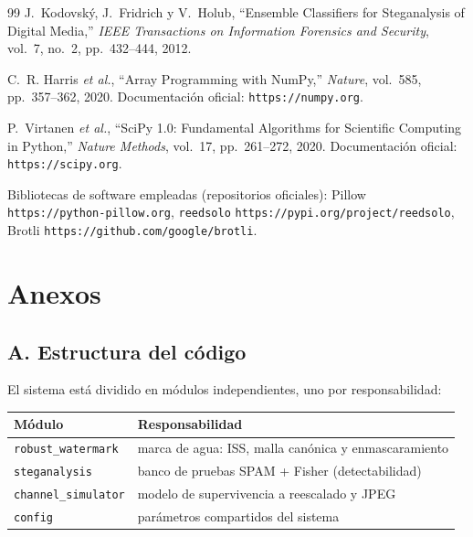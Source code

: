 \documentclass[12pt,a4paper]{article}
\begin{document}
\begin{thebibliography}{99}
J.~Kodovský, J.~Fridrich y V.~Holub, ``Ensemble Classifiers for Steganalysis of
Digital Media,'' \emph{IEEE Transactions on Information Forensics and Security},
vol.~7, no.~2, pp.~432--444, 2012.

C.~R. Harris \emph{et al.}, ``Array Programming with NumPy,'' \emph{Nature},
vol.~585, pp.~357--362, 2020. Documentación oficial: \texttt{https://numpy.org}.

P.~Virtanen \emph{et al.}, ``SciPy 1.0: Fundamental Algorithms for Scientific
Computing in Python,'' \emph{Nature Methods}, vol.~17, pp.~261--272, 2020.
Documentación oficial: \texttt{https://scipy.org}.

Bibliotecas de software empleadas (repositorios oficiales):
Pillow \texttt{https://python-pillow.org},
\texttt{reedsolo} \texttt{https://pypi.org/project/reedsolo},
Brotli \texttt{https://github.com/google/brotli}.

\end{thebibliography}

\section{Anexos}

\subsection*{A. Estructura del código}
El sistema está dividido en módulos independientes, uno por responsabilidad:

\begin{table}[H]
\centering
\begin{tabular}{@{}ll@{}}
\toprule
\textbf{Módulo} & \textbf{Responsabilidad} \\
\midrule
\texttt{robust\_watermark} & marca de agua: ISS, malla canónica y enmascaramiento \\
\texttt{steganalysis} & banco de pruebas SPAM + Fisher (detectabilidad) \\
\texttt{channel\_simulator} & modelo de supervivencia a reescalado y JPEG \\
\texttt{config} & parámetros compartidos del sistema \\
\bottomrule
\end{tabular}
\end{table}
\end{document}
